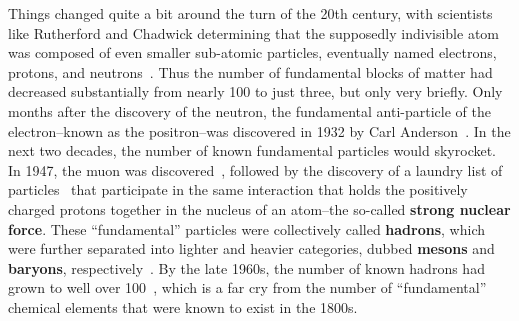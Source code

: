 Things changed quite a bit around the turn of the 20th century, with scientists like Rutherford and Chadwick determining that the supposedly indivisible atom was composed of even smaller sub-atomic particles, eventually named electrons, protons, and neutrons~\cite{Electrons, Protons, Neutrons}. Thus the number of fundamental blocks of matter had decreased substantially from nearly 100 to just three, but only very briefly. Only months after the discovery of the neutron, the fundamental anti-particle of the electron--known as the positron--was discovered in 1932 by Carl Anderson~\cite{Positron}. In the next two decades, the number of known fundamental particles would skyrocket. In 1947, the muon was discovered~\cite{Muon}, followed by the discovery of a laundry list of particles~\cite{Kaon,Lambda,Sigma} that participate in the same interaction that holds the positively charged protons together in the nucleus of an atom--the so-called \textbf{strong nuclear force}. These ``fundamental'' particles were collectively called \textbf{hadrons}, which were further separated into lighter and heavier categories, dubbed \textbf{mesons} and \textbf{baryons}, respectively~\cite{MesonBaryon}. By the late 1960s, the number of known hadrons had grown to well over 100~\cite{ParticleDiscoveries}, which is a far cry from the number of ``fundamental'' chemical elements that were known to exist in the 1800s.

